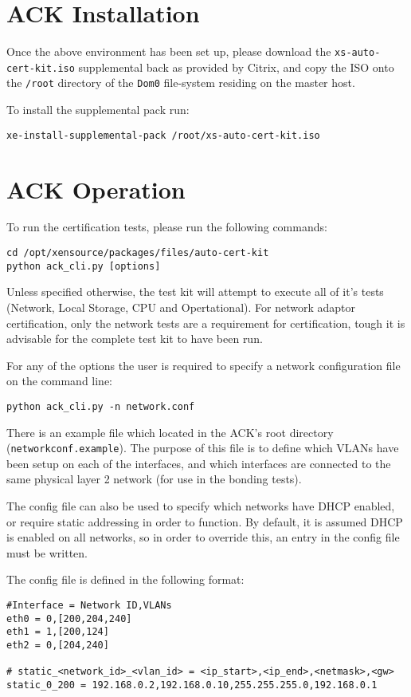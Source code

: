 \documentclass[a4paper,11pt]{article}
\begin{document}
\section{ACK Installation}
Once the above environment has been set up, please download the \verb=xs-auto-cert-kit.iso= supplemental back as provided by Citrix, and copy the ISO onto the \verb=/root= directory of the \verb=Dom0= file-system residing on the master host.

To install the supplemental pack run:
\begin{verbatim}
xe-install-supplemental-pack /root/xs-auto-cert-kit.iso
\end{verbatim}

\section{ACK Operation}
To run the certification tests, please run the following commands:
\begin{verbatim}
cd /opt/xensource/packages/files/auto-cert-kit
python ack_cli.py [options]
\end{verbatim}

Unless specified otherwise, the test kit will attempt to execute all of it's tests (Network, Local Storage, CPU and Opertational). For network adaptor certification, only the network tests are a requirement for certification, tough it is advisable for the complete test kit to have been run.

For any of the options the user is required to specify a network configuration file on the command line:

\begin{verbatim}
python ack_cli.py -n network.conf
\end{verbatim}

There is an example file which located in the ACK's root directory (\verb=networkconf.example=). The purpose of this file is to define which VLANs have been setup on each of the interfaces, and which interfaces are connected to the same physical layer 2 network (for use in the bonding tests).

The config file can also be used to specify which networks have DHCP enabled, or require static addressing in order to function. By default, it is assumed DHCP is enabled on all networks, so in order to override this, an entry in the config file must be written.

The config file is defined in the following format:

\begin{verbatim}
#Interface = Network ID,VLANs
eth0 = 0,[200,204,240]
eth1 = 1,[200,124]
eth2 = 0,[204,240]

# static_<network_id>_<vlan_id> = <ip_start>,<ip_end>,<netmask>,<gw>
static_0_200 = 192.168.0.2,192.168.0.10,255.255.255.0,192.168.0.1
\end{verbatim}
\end{document}
